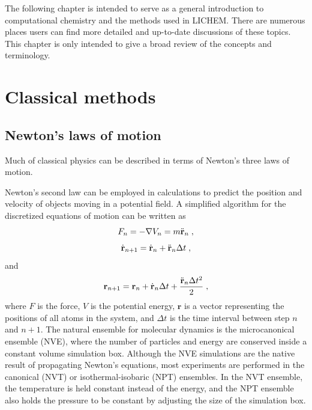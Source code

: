 \documentclass[12pt]{report}
\begin{document}
The following chapter is intended to serve as a general introduction to
computational chemistry and the methods used in LICHEM.
There are numerous places users can find more detailed and up-to-date
discussions of these topics.
This chapter is only intended to give a broad review of the concepts and
terminology.

\section{Classical methods}

\subsection{Newton's laws of motion}

Much of classical physics can be described in terms of Newton's three laws of
motion.
\begin{quote}
\end{quote}
Newton's second law can be employed in calculations to predict the position
and velocity of objects moving in a potential field.
A simplified algorithm for the discretized equations of motion can be written
as
\begin{equation}
 F_{n} = -\nabla V_{n} = m\ddot {\textbf r}_{n} \; ,
\end{equation}
\begin{equation}
 \dot {\textbf r}_{n+1} = \dot {\textbf r}_{n}+\ddot {\textbf r}_{n}
 \Delta t \; ,
\end{equation}
and
\begin{equation}
 {\textbf r}_{n+1} = {\textbf r}_{n}+\dot {\textbf r}_{n}\Delta t
 +\frac{\ddot {\textbf r}_{n}\Delta t^2}{2} \; ,
\end{equation}
where $F$ is the force, $V$ is the potential energy, $\textbf{r}$ is a vector
representing the positions of all atoms in the system, and $\Delta t$ is the
time interval between step $n$ and $n+1$.
The natural ensemble for molecular dynamics is the microcanonical ensemble
(NVE), where the number of particles and energy are conserved inside a
constant volume simulation box.
Although the NVE simulations are the native result of propagating Newton's
equations, most experiments are performed in the canonical (NVT) or
isothermal-isobaric (NPT) ensembles.
In the NVT ensemble, the temperature is held constant instead of the energy,
and the NPT ensemble also holds the pressure to be constant by adjusting the
size of the simulation box.
\end{document}
